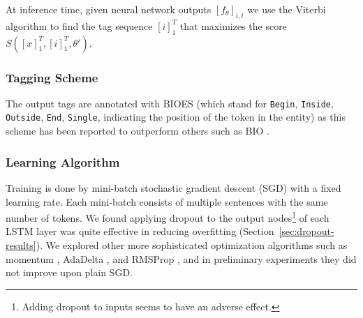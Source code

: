 \documentclass[11pt,letterpaper]{article}
\begin{document}
At inference time, given neural network outputs $[f_{\theta}]_{i,t}$ we use the Viterbi algorithm to find the tag sequence $[i]_1^T$ that maximizes the score $S([x]_1^T, [i]_1^T, \theta')$. 

\subsubsection{Tagging Scheme}

The output tags are annotated with BIOES (which stand for {\tt Begin}, 
{\tt Inside}, {\tt Outside}, {\tt End}, {\tt Single}, indicating the position of the token in the entity) as this scheme has been reported to outperform others such as BIO \cite{ratinov2009}.

\subsubsection{Learning Algorithm}

Training is done by mini-batch stochastic gradient descent (SGD) with a fixed learning rate. Each mini-batch consists of multiple sentences with the same number of tokens. 
We found applying dropout to the output nodes\footnote{Adding dropout to inputs seems to have an adverse effect.} of each LSTM layer \cite{pham2014} was quite effective in reducing overfitting (Section~\ref{sec:dropout-results}).
We explored other more sophisticated optimization algorithms such as momentum \cite{nesterov1983}, AdaDelta \cite{zeiler2012}, and RMSProp \cite{hinton2012}, and in preliminary experiments they did not %
    improve upon plain SGD. 
\end{document}

